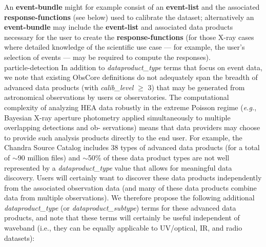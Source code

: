 \documentclass[11pt,a4paper]{ivoa}
\begin{document}
An {\bf event-bundle} might for example consist of an {\bf event-list} and the associated {\bf response-functions} (see below) used to calibrate the dataset; alternatively an {\bf event-bundle} may include the {\bf event-list} and associated  data products necessary for the user to create the {\bf response-functions} (for those X-ray cases where detailed knowledge of the scientific use case — for example, the user’s selection of events — may be required to compute the responses).\\
particle-detection
In addition to {\em dataproduct\_type} terms that focus on event data, we note that existing ObsCore definitions do not adequately span the breadth of advanced data products (with {\em calib\_level} $\ge$ 3) that may be generated from astronomical observations by users or observatories. The computational complexity of analyzing \gls{HEA} data robustly in the extreme Poisson regime ({\em e.g.\/}, Bayesian X-ray aperture photometry applied simultaneously to multiple overlapping detections and ob-
servations) means that data providers may choose to provide such analysis products directly to the end user. For example, the Chandra Source Catalog includes 38 types of advanced data products (for a total of $\sim$90 million files) and $\sim$50\% of these data product types are not well represented by a  {\em dataproduct\_type} value that allows for meaningful data discovery. Users will certainly want to discover these data products independently from the associated observation data (and many of these data products combine data from multiple observations). We therefore propose the following additional
{\em dataproduct\_type} (or {\em dataproduct\_subtype}) terms for these advanced data products, and note that these terms will certainly be useful independent of waveband (i.e., they can be equally applicable to UV/optical, IR, and radio datasets):
\end{document}
